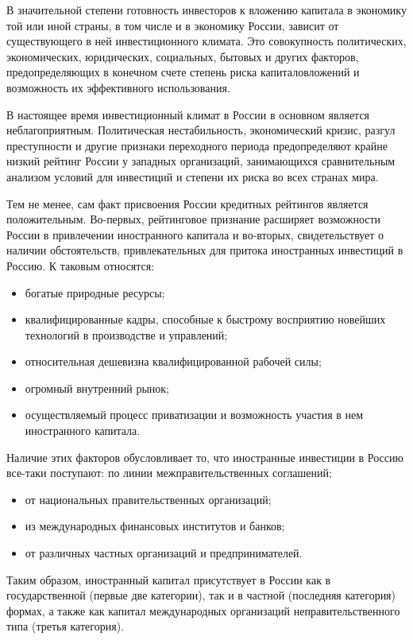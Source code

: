 В значительной степени готовность инвесторов к вложению капитала в экономику той или иной страны, в том числе и в экономику России, зависит от существующего в ней инвестиционного климата. Это совокупность политических, экономических, юридических, социальных, бытовых и других факторов, предопределяющих в конечном счете степень риска капиталовложений и возможность их эффективного использования.

В настоящее время инвестиционный климат в России в основном является неблагоприятным. Политическая нестабильность, экономический кризис, разгул преступности и другие признаки переходного периода предопределяют крайне низкий рейтинг России у западных организаций, занимающихся сравнительным анализом условий для инвестиций и степени их риска во всех странах мира.

Тем не менее, сам факт присвоения России кредитных рейтингов является положительным. Во-первых, рейтинговое признание расширяет возможности России в привлечении иностранного капитала и во-вторых, свидетельствует о наличии обстоятельств, привлекательных для притока иностранных инвестиций в Россию. К таковым относятся:
\begin{itemize}
	\item богатые природные ресурсы;
\item квалифицированные кадры, способные к быстрому восприятию новейших технологий в производстве и управлений;
\item относительная дешевизна квалифицированной рабочей силы;
\item огромный внутренний рынок;
\item осуществляемый процесс приватизации и возможность участия в нем иностранного капитала.
\end{itemize}

Наличие этих факторов обусловливает то, что иностранные инвестиции в Россию все-таки поступают:
по линии межправительственных соглашений;
\begin{itemize}
	\item от национальных правительственных организаций;
\item из международных финансовых институтов и банков;
\item от различных частных организаций и предпринимателей.
\end{itemize}

Таким образом, иностранный капитал присутствует в России как в государственной (первые две категории), так и в частной (последняя категория) формах, а также как капитал международных организаций неправительственного типа (третья категория).


